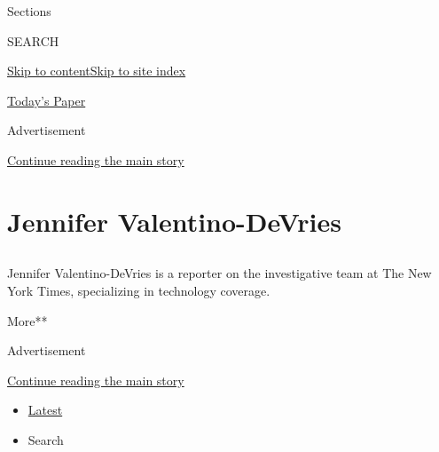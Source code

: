 Sections

SEARCH

\protect\hyperlink{site-content}{Skip to
content}\protect\hyperlink{site-index}{Skip to site index}

\href{https://myaccount.nytimes.com/auth/login?response_type=cookie\&client_id=vi}{}

\href{https://www.nytimes.com/section/todayspaper}{Today's Paper}

Advertisement

\protect\hyperlink{after-top}{Continue reading the main story}

\hypertarget{jennifer-valentino-devries}{%
\section{Jennifer Valentino-DeVries}\label{jennifer-valentino-devries}}

\subsection{}

Jennifer Valentino-DeVries is a reporter on the investigative team at
The New York Times, specializing in technology coverage.

More**

Advertisement

\protect\hyperlink{after-mid1}{Continue reading the main story}

\begin{itemize}
\tightlist
\item
  \protect\hyperlink{stream-panel}{Latest}
\item
  Search
\end{itemize}

